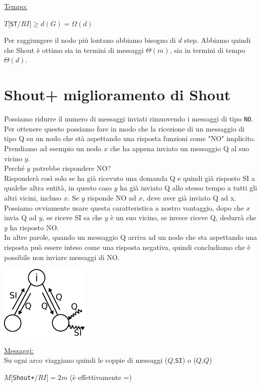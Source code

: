 \underline{Tempo:}
\begin{center}
    $T[$\texttt{ST}$/RI] \geq d(G) = \Omega(d)$
\end{center}
Per raggiungere il nodo più lontano abbiamo bisogno di $d$ step. Abbiamo quindi
che Shout è ottimo sia in termini di messaggi $\Theta(m)$, sia in termini di
tempo $\Theta(d)$.

\section{Shout+ miglioramento di Shout}
Possiamo ridurre il numero di messaggi inviati rimuovendo i messaggi di tipo
\texttt{NO}. Per ottenere questo possiamo fare in modo che la ricezione di un
messaggio di tipo Q su un nodo che stà aspettando una risposta funzioni come
"NO" implicito.\\
Prendiamo ad esempio un nodo $x$ che ha appena inviato un messaggio Q al suo
vicino $y$.\\ Perché $y$ potrebbe rispondere NO? \\Risponderà così solo se ha
già ricevuto una domanda Q e quindi già risposto SI a qualche altra entità, in
questo caso $y$ ha già inviato Q allo stesso tempo a tutti gli altri vicini,
incluso $x$. Se $y$ risponde NO ad $x$, deve aver già inviato Q ad x. Possiamo
ovviamente usare questa caratteristica a nostro vantaggio, dopo che $x$ invia Q
ad $y$, se riceve SI sa che $y$ è un suo vicino, se invece riceve Q, dedurrà che
$y$ ha risposto NO.\\
In altre parole, quando un messaggio Q arriva ad un nodo che sta aspettando una
risposta può essere inteso come una risposta negativa, quindi concludiamo che è
possibile non inviare messaggi di NO.
\begin{center}
    \includegraphics[scale=1.4]{capitoli/costruzione-spanning-tree/imgs/n_23}
\end{center}
\underline{Messaggi:}\\
Su ogni arco viaggiano quindi le coppie di messaggi ($Q$,\texttt{SI}) o
($Q$,$Q$)

\begin{center}
    $M[$\texttt{Shout+}$/RI] = 2m$ (è effettivamente =)\\
\end{center}

